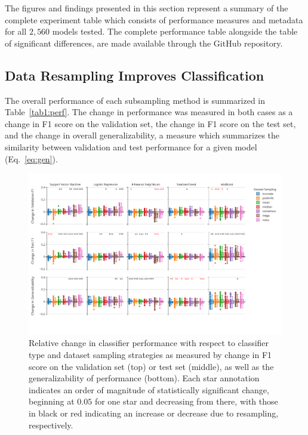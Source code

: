\documentclass[num-refs]{nbdt-article}
\begin{document}
The figures and findings presented in this section represent a summary of the complete experiment table which consists of performance measures and metadata for all $2,560$ models tested. The complete performance table alongside the table of significant differences, are made available through the GitHub repository.

\subsection{Data Resampling Improves Classification}

The overall performance of each subsampling method is summarized in Table~\ref{tab1:perf}. The change in performance was measured in both cases as a change in F1 score on the validation set, the change in F1 score on the test set, and the change in overall generalizability, a measure which summarizes the similarity between validation and test performance for a given model (Eq.~\ref{eq:gen}).


\begin{figure}[bth!]\centering
\includegraphics[width=\linewidth]{figures/1.pdf}
\caption{Relative change in classifier performance with respect to classifier type and dataset sampling strategies as measured by change in F1 score on the validation set (top) or test set (middle), as well as the generalizability of performance (bottom). Each star annotation indicates an order of magnitude of statistically significant change, beginning at $0.05$ for one star and decreasing from there, with those in black or red indicating an increase or
decrease due to resampling, respectively.}
\label{fig:overall_perf}
\end{figure}
\end{document}
